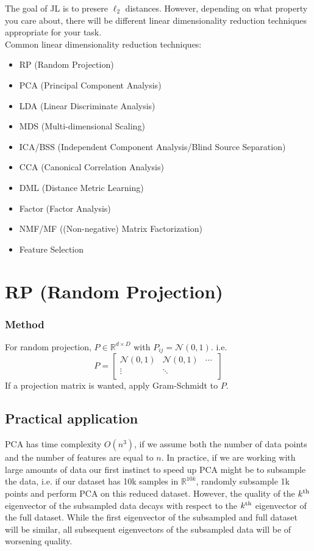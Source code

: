 The goal of JL is to presere $\ell_{2}$ distances. However, depending
on what property you care about, there will be different linear
dimensionality reduction techniques appropriate for your task. \\ 

\noindent Common linear dimensionality reduction techniques:
\begin{itemize}
\item RP (Random Projection)
\item PCA (Principal Component Analysis)
\item LDA (Linear Discriminate Analysis)
\item MDS (Multi-dimensional Scaling)
\item ICA/BSS (Independent Component Analysis/Blind Source Separation)
\item CCA (Canonical Correlation Analysis)
\item DML (Distance Metric Learning)
\item Factor (Factor Analysis)
\item NMF/MF ((Non-negative) Matrix Factorization)
\item Feature Selection
\end{itemize}

\section{RP (Random Projection)}
\subsubsection*{Method}
For random projection, $P\in \mathbb{R}^{d\times D}$ with $P_{ij} =
\mathcal{N}(0,1)$. i.e. 
\[
P = 
\begin{bmatrix}
    \mathcal{N}(0,1) & \mathcal{N}(0,1) & \dotsm\ \\
    \vdots & \ddots & \\
\end{bmatrix}
\]
If a projection matrix is wanted, apply Gram-Schmidt to $P$.

\subsection{Practical application}
PCA has time complexity $O(n^3)$, if we assume both the number of data
points and the number of features are equal to $n$. In practice, if we
are working with large amounts of data our first instinct to speed up
PCA might be to subsample the data, i.e. if our dataset has 10k
samples in $\mathbb{R}^{10k}$, randomly subsample 1k points and
perform PCA on this reduced dataset. However, the quality of the
$k^{\rm th}$ eigenvector of the subsampled data decays with respect to
the $k^{\rm th}$ eigenvector of the full dataset. While the first
eigenvector of the subsampled and full dataset will be similar, all
subsequent eigenvectors of the subsampled data will be of worsening
quality.  

